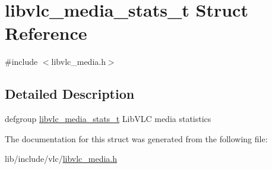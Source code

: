 \hypertarget{structlibvlc__media__stats__t}{}\section{libvlc\+\_\+media\+\_\+stats\+\_\+t Struct Reference}
\label{structlibvlc__media__stats__t}


{\ttfamily \#include $<$libvlc\+\_\+media.\+h$>$}



\subsection{Detailed Description}
defgroup \hyperlink{structlibvlc__media__stats__t}{libvlc\+\_\+media\+\_\+stats\+\_\+t} Lib\+V\+LC media statistics 

The documentation for this struct was generated from the following file\+:\begin{DoxyCompactItemize}
\item 
lib/include/vlc/\hyperlink{libvlc__media_8h}{libvlc\+\_\+media.\+h}\end{DoxyCompactItemize}
